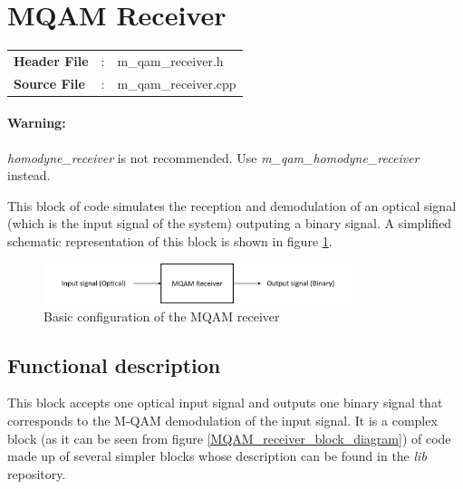 \clearpage

\section{MQAM Receiver}\label{lib:mqamRx}

\begin{tcolorbox}	
	\begin{tabular}{p{2.75cm} p{0.2cm} p{10.5cm}} 	
		\textbf{Header File}   &:& m\_qam\_receiver.h \\
		\textbf{Source File}   &:& m\_qam\_receiver.cpp \\
	\end{tabular}
\end{tcolorbox}

\paragraph{Warning:}\textit{homodyne\_receiver} is not recommended. Use \textit{m\_qam\_homodyne\_receiver} instead.
\newline

This block of code simulates the reception and demodulation of an optical signal (which is the input signal of the system) outputing a binary signal. A simplified schematic representation of this block is shown in figure \ref{MQAM_receiver_block_diagram_simple}.

\begin{figure}[h]
	\centering
	\includegraphics[width=0.8\textwidth]{../lib/homodyne_receiver/figures/MQAM_receiver_block_diagram_simple}
	\caption{Basic configuration of the MQAM receiver}\label{MQAM_receiver_block_diagram_simple}
\end{figure}

\subsection*{Functional description}

This block accepts one optical input signal and outputs one binary signal that corresponds to the M-QAM demodulation of the input signal. It is a complex block (as it can be seen from figure \ref{MQAM_receiver_block_diagram}) of code made up of several simpler blocks whose description can be found in the \textit{lib} repository.

